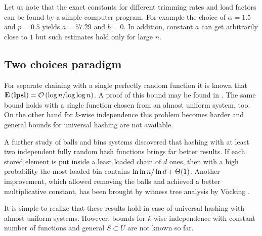 Let us note that the exact constants for different trimming rates and load factors can be found by a simple computer program.
For example the choice of $\alpha = 1.5$ and $p = 0.5$ yields $a = 57.29$ and $b = 0$.
In addition, constant $a$ can get arbitrarily close to $1$ but such estimates hold only for large $n$.

\subsection{Two choices paradigm}
For separate chaining with a single perfectly random function it is known that $\mathbf{E}\left(\mathbf{lpsl}\right) = \mathcal{O}\left({\log n}/{\log \log n}\right)$. 
A proof of this bound may be found in \cite{DBLP:books/sp/Mehlhorn84}. 
The same bound holds with a single function chosen from an almost uniform system, too.
On the other hand for $k$-wise independence this problem becomes harder and general bounds for universal hashing are not available.

A further study \cite{DBLP:conf/stoc/AzarBKU94} of balls and bins systems discovered that hashing with at least two independent fully random hash functions brings far better results. 
If each stored element is put inside a least loaded chain of $d$ ones, then with a high probability the most loaded bin contains ${\ln \ln n}/\ln d + \mathrm{\Theta}(1)$.
Another improvement, which allowed removing the balls and achieved a better multiplicative constant, has been brought by witness tree analysis by Vöcking \cite{DBLP:journals/jacm/Vocking03}. 

It is simple to realize that these results hold in case of universal hashing with almost uniform systems. However, bounds for $k$-wise independence with constant number of functions and general $S \subset U$ are not known so far.

